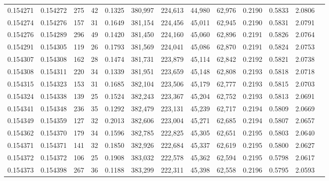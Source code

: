 \begin{tabular}{rrrrrrrrrrrrr}
0.154271 & 0.154272 &   275 &  42 &                                     0.1325 & 380,997 & 224,613 &  44,980 &  62,976 & 0.2190 & 0.5833 & 2.0806 \\
0.154274 & 0.154276 &   157 &  31 &                                     0.1649 & 381,154 & 224,456 &  45,011 &  62,945 & 0.2190 & 0.5831 & 2.0791 \\
0.154276 & 0.154289 &   296 &  49 &                                     0.1420 & 381,450 & 224,160 &  45,060 &  62,896 & 0.2191 & 0.5826 & 2.0764 \\
0.154291 & 0.154305 &   119 &  26 &                                     0.1793 & 381,569 & 224,041 &  45,086 &  62,870 & 0.2191 & 0.5824 & 2.0753 \\
0.154307 & 0.154308 &   162 &  28 &                                     0.1474 & 381,731 & 223,879 &  45,114 &  62,842 & 0.2192 & 0.5821 & 2.0738 \\
0.154308 & 0.154311 &   220 &  34 &                                     0.1339 & 381,951 & 223,659 &  45,148 &  62,808 & 0.2193 & 0.5818 & 2.0718 \\
0.154315 & 0.154323 &   153 &  31 &                                     0.1685 & 382,104 & 223,506 &  45,179 &  62,777 & 0.2193 & 0.5815 & 2.0703 \\
0.154324 & 0.154338 &   139 &  25 &                                     0.1524 & 382,243 & 223,367 &  45,204 &  62,752 & 0.2193 & 0.5813 & 2.0691 \\
0.154341 & 0.154348 &   236 &  35 &                                     0.1292 & 382,479 & 223,131 &  45,239 &  62,717 & 0.2194 & 0.5809 & 2.0669 \\
0.154349 & 0.154359 &   127 &  32 &                                     0.2013 & 382,606 & 223,004 &  45,271 &  62,685 & 0.2194 & 0.5807 & 2.0657 \\
0.154362 & 0.154370 &   179 &  34 &                                     0.1596 & 382,785 & 222,825 &  45,305 &  62,651 & 0.2195 & 0.5803 & 2.0640 \\
0.154371 & 0.154371 &   141 &  32 &                                     0.1850 & 382,926 & 222,684 &  45,337 &  62,619 & 0.2195 & 0.5800 & 2.0627 \\
0.154372 & 0.154372 &   106 &  25 &                                     0.1908 & 383,032 & 222,578 &  45,362 &  62,594 & 0.2195 & 0.5798 & 2.0617 \\
0.154373 & 0.154398 &   267 &  36 &                                     0.1188 & 383,299 & 222,311 &  45,398 &  62,558 & 0.2196 & 0.5795 & 2.0593 \\

\end{tabular}
